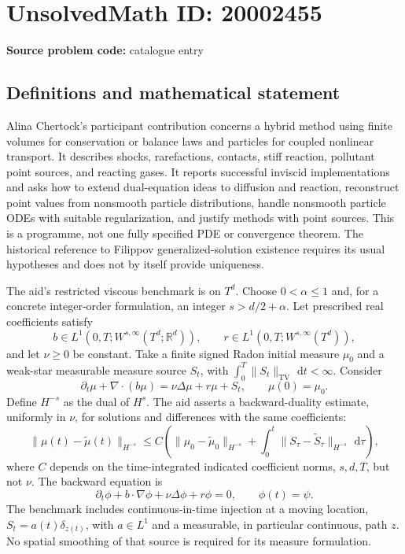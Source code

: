 \documentclass[11pt]{article}
\newcommand{\R}{\mathbb{R}}
\newcommand{\dd}{\,\mathrm{d}}
\begin{document}
\section*{UnsolvedMath ID: 20002455}
\textbf{Source problem code:} catalogue entry
\subsection{Definitions and mathematical statement}
Alina Chertock's participant contribution concerns a hybrid method using finite volumes for conservation or balance laws and particles for coupled nonlinear transport. It describes shocks, rarefactions, contacts, stiff reaction, pollutant point sources, and reacting gases. It reports successful inviscid implementations and asks how to extend dual-equation ideas to diffusion and reaction, reconstruct point values from nonsmooth particle distributions, handle nonsmooth particle ODEs with suitable regularization, and justify methods with point sources. This is a programme, not one fully specified PDE or convergence theorem. The historical reference to Filippov generalized-solution existence requires its usual hypotheses and does not by itself provide uniqueness.

The aid's restricted viscous benchmark is on \(T^d\). Choose \(0<\alpha\le1\) and, for a concrete integer-order formulation, an integer \(s>d/2+\alpha\). Let prescribed real coefficients satisfy
\[
 b\in L^1(0,T;W^{s,\infty}(T^d;\R^d)),\qquad
 r\in L^1(0,T;W^{s,\infty}(T^d)),
\]
and let \(\nu\ge0\) be constant. Take a finite signed Radon initial measure \(\mu_0\) and a weak-star measurable measure source \(S_t\), with \(\int_0^T\|S_t\|_{\mathrm{TV}}\,\dd t<\infty\). Consider
\[
 \partial_t\mu+\nabla\cdot(b\mu)=\nu\Delta\mu+r\mu+S_t,
 \qquad\mu(0)=\mu_0.
\]
Define \(H^{-s}\) as the dual of \(H^s\). The aid asserts a backward-duality estimate, uniformly in \(\nu\), for solutions and differences with the same coefficients:
\[
 \|\mu(t)-\widetilde\mu(t)\|_{H^{-s}}
 \le C\left(\|\mu_0-\widetilde\mu_0\|_{H^{-s}}
 +\int_0^t\|S_\tau-\widetilde S_\tau\|_{H^{-s}}\,\dd\tau\right),
\]
where \(C\) depends on the time-integrated indicated coefficient norms, \(s,d,T\), but not \(\nu\). The backward equation is
\[
 \partial_t\phi+b\cdot\nabla\phi+\nu\Delta\phi+r\phi=0,
 \qquad\phi(t)=\psi.
\]
The benchmark includes continuous-in-time injection at a moving location, \(S_t=a(t)\delta_{z(t)}\), with \(a\in L^1\) and a measurable, in particular continuous, path \(z\). No spatial smoothing of that source is required for its measure formulation.
\end{document}
